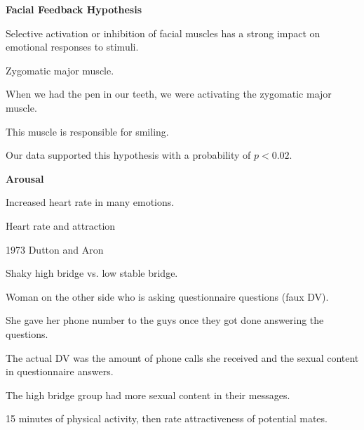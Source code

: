 \begin{enumerate}
\begin{coloredlist}
\begin{coloredlist}
        \end{coloredlist}
        \item \textbf{Facial Feedback Hypothesis}
        \begin{coloredlist}
            \item Selective activation or inhibition of facial muscles has a strong impact on emotional responses to stimuli.
            \item Zygomatic major muscle.
            \begin{coloredlist}
                \item When we had the pen in our teeth, we were activating the zygomatic major muscle.
                \item This muscle is responsible for smiling.
            \end{coloredlist}
            \item Our data supported this hypothesis with a probability of \(p < 0.02\).
        \end{coloredlist}
        \item \textbf{Arousal}
        \begin{coloredlist}
            \item Increased heart rate in many emotions.
            \item Heart rate and attraction
            \begin{coloredlist}
                \item 1973 Dutton and Aron
                \begin{coloredlist}
                    \item Shaky high bridge vs. low stable bridge.
                    \item Woman on the other side who is asking questionnaire questions (faux DV).
                    \item She gave her phone number to the guys once they got done answering the questions.
                    \item The actual DV was the amount of phone calls she received and the sexual content in questionnaire answers.
                    \item The high bridge group had more sexual content in their messages.
                \end{coloredlist}
                \item 15 minutes of physical activity, then rate attractiveness of potential mates.
            \end{coloredlist}
        \end{coloredlist}
        \item 
    \end{coloredlist}
\end{enumerate}

